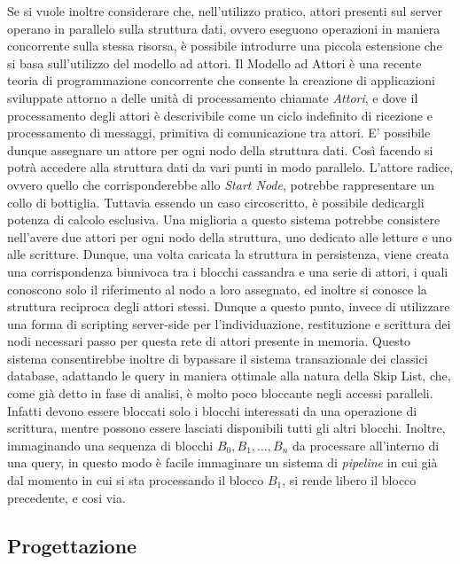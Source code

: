 		Se si vuole inoltre considerare che, nell'utilizzo pratico, attori presenti sul server operano in parallelo sulla struttura dati, ovvero eseguono operazioni in maniera concorrente sulla stessa risorsa, è possibile introdurre una piccola estensione che si basa sull'utilizzo del modello ad attori. Il Modello ad Attori è una recente teoria di programmazione concorrente che consente la creazione di applicazioni sviluppate attorno a delle unità di processamento chiamate \textit{Attori}, e dove il processamento degli attori è descrivibile come un ciclo indefinito di ricezione e processamento di messaggi, primitiva di comunicazione tra attori.
		E' possibile dunque assegnare un attore per ogni nodo della struttura dati. Così facendo si potrà accedere alla struttura dati da vari punti in modo parallelo. L'attore radice, ovvero quello che corrisponderebbe allo \textit{Start Node}, potrebbe rappresentare un collo di bottiglia. Tuttavia essendo un caso circoscritto, è possibile dedicargli potenza di calcolo esclusiva. Una miglioria a questo sistema potrebbe consistere nell'avere due attori per ogni nodo della struttura, uno dedicato alle letture e uno alle scritture.
		Dunque, una volta caricata la struttura in persistenza, viene creata una corrispondenza biunivoca tra i blocchi cassandra e una serie di attori, i quali conoscono solo il riferimento al nodo a loro assegnato, ed inoltre si conosce la struttura reciproca degli attori stessi. Dunque a questo punto, invece di utilizzare una forma di scripting server-side per l'individuazione, restituzione e scrittura dei nodi necessari passo per questa rete di attori presente in memoria.
		Questo sistema consentirebbe inoltre di bypassare il sistema transazionale dei classici database, adattando le query in maniera ottimale alla natura della Skip List, che, come già detto in fase di analisi, è molto poco bloccante negli accessi paralleli. Infatti devono essere bloccati solo i blocchi interessati da una operazione di scrittura, mentre possono essere lasciati disponibili tutti gli altri blocchi. Inoltre, immaginando una sequenza di blocchi $ B_{0}, B_{1}, ..., B_{n} $ da processare all'interno di una query, in questo modo è facile immaginare un sistema di \textit{pipeline} in cui già dal momento in cui si sta processando il blocco $ B_{1} $, si rende libero il blocco precedente, e cosi via.

	\subsection{Progettazione}








